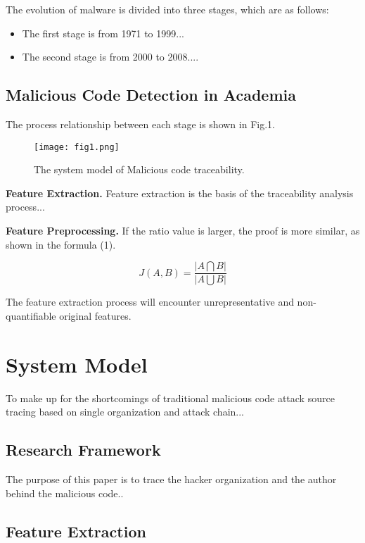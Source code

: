 \documentclass[conference]{IEEEtran}
\begin{document}
The evolution of malware is divided into three stages, which are as follows:
	
\begin{itemize}
	\item The first stage is from 1971 to 1999...
	\item The second stage is from 2000 to 2008....
\end{itemize}

\subsection{Malicious Code Detection in Academia}

The process relationship between each stage is shown in Fig.1.

\begin{figure}[htbp]
	\centering
	\texttt{[image: fig1.png]}
	\caption{The system model of Malicious code traceability.}
	\label{fig1}
\end{figure}


\noindent
\textbf{Feature Extraction.} Feature extraction is the basis of the traceability analysis process...

\noindent
\textbf{Feature Preprocessing.} If the ratio value is larger, the proof is more similar, as shown in the formula (1).

\begin{equation}
J(A,B) = \frac{|A \bigcap B|}{|A \bigcup B|} \label{eq}
\end{equation}

The feature extraction process will encounter unrepresentative and non-quantifiable original features.

\section{System Model}
To make up for the shortcomings of traditional malicious code attack source tracing based on single organization and attack chain...

\subsection{Research Framework}\label{RF}
The purpose of this paper is to trace the hacker organization and the author behind the malicious code..

\subsection{Feature Extraction}
\end{document}
